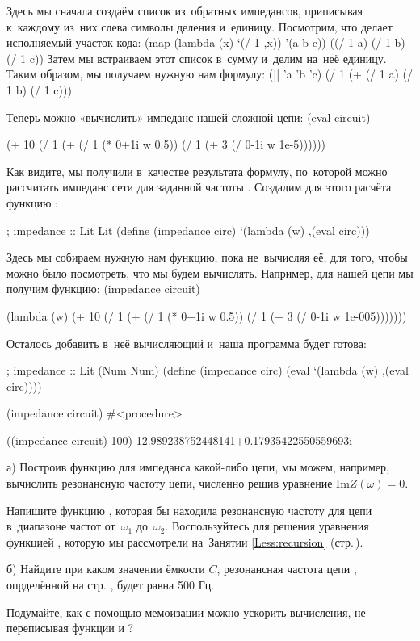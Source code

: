 Здесь мы сначала создаём список из~обратных импедансов, приписывая к~каждому из~них слева символы деления и~единицу. Посмотрим, что делает исполняемый участок кода:
\REPL
  {(map (lambda (x) `(/ 1 ,x)) '(a b c))}
  {((/ 1 a) (/ 1 b) (/ 1 c))}
\noindent Затем мы встраиваем этот список в~сумму и~делим на~неё единицу. Таким образом, мы получаем нужную нам формулу:
\REPL
  {(|| 'a 'b 'c)}
  {(/ 1 (+ (/ 1 a) (/ 1 b) (/ 1 c)))}

Теперь можно «вычислить» импеданс нашей сложной цепи:
\REPLin
  {(eval circuit)}
\begin{mREPLout}
   (+ 10 (/ 1 (+ (/ 1 (* 0+1i w 0.5))
         (/ 1 (+ 3 (/ 0-1i w 1e-5))))))
\end{mREPLout}
\noindent Как видите, мы получили в~качестве результата формулу, по~которой можно рассчитать импеданс сети для заданной частоты . Создадим для этого расчёта функцию :

\begin{Definition}[emph={w,circ}]
; impedance :: Lit \arrow Lit
(define (impedance circ)
  `(lambda (w) ,(eval circ)))
\end{Definition}

Здесь мы собираем нужную нам функцию, пока не~вычисляя её, для того, чтобы можно было посмотреть, что мы будем вычислять. Например, для нашей цепи мы получим функцию:
\REPLin
  {(impedance circuit)}
\begin{mREPLout}
  (lambda (w)
    (+ 10 (/ 1 (+ (/ 1 (* 0+1i w 0.5))
               (/ 1 (+ 3 (/ 0-1i w 1e-005)))))))  
\end{mREPLout}

Осталось добавить в~неё вычисляющий  и~наша программа будет готова:

\begin{Definition}[emph={w,circ}]
; impedance :: Lit \arrow (Num \arrow Num)
(define (impedance circ)
  (eval `(lambda (w) ,(eval circ))))
\end{Definition}

\REPL
  {(impedance circuit)}
  {\#<procedure>}

\REPL
  {((impedance circuit) 100)}
  {12.989238752448141+0.17935422550559693i}

\newpage
\begin{Assignment}

а) Построив функцию для импеданса какой-либо цепи, мы можем, например, вычислить резонансную частоту цепи, численно решив уравнение $\mathrm{Im} Z(\omega) = 0$.

Напишите функцию , которая бы находила резонансную частоту для цепи  в~диапазоне частот от~$\omega_1$ до~$\omega_2$. Воспользуйтесь для решения уравнения функцией , которую мы рассмотрели на~Занятии \ref{Less:recursion}  (стр.\,\pageref{bisection}).

б) Найдите при каком значении ёмкости $C$, резонансная частота цепи , опрделённой на стр. \pageref{circuit}, будет равна 500 Гц. 

Подумайте, как с помощью мемоизации можно ускорить вычисления, не переписывая функции  и ?
\end{Assignment}

